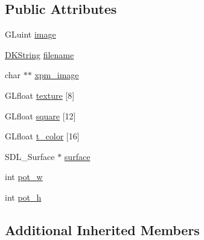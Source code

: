 \subsection*{Public Attributes}
\begin{DoxyCompactItemize}
\item 
G\-Luint \hyperlink{class_d_k_image_ac6a91aafc8bd16854d644186b2c3497b}{image}
\item 
\hyperlink{_d_k_string_8h_ac168e8555ceba18e1a2919b21976bc84}{D\-K\-String} \hyperlink{class_d_k_image_a12b6108f0fee5230984fd2275c24a8ae}{filename}
\item 
char $\ast$$\ast$ \hyperlink{class_d_k_image_a5552759919ce7e0ad63c542838e19fbe}{xpm\-\_\-image}
\item 
G\-Lfloat \hyperlink{class_d_k_image_a83ea3b25f68ec8d02b6a5b4daf18a2d5}{texture} \mbox{[}8\mbox{]}
\item 
G\-Lfloat \hyperlink{class_d_k_image_a7b0cb338893f6327718b19c92ffef3d4}{square} \mbox{[}12\mbox{]}
\item 
G\-Lfloat \hyperlink{class_d_k_image_ae6c9b9d773b56e6be7bc6fd3d299eb47}{t\-\_\-color} \mbox{[}16\mbox{]}
\item 
S\-D\-L\-\_\-\-Surface $\ast$ \hyperlink{class_d_k_image_ab8cc39cd81a6f73beca7392f6cb67abe}{surface}
\item 
int \hyperlink{class_d_k_image_a3df23f7ab223f3d7e6e2654395ef6fe1}{pot\-\_\-w}
\item 
int \hyperlink{class_d_k_image_ae9cdd848d1f31c486d4433b3739363a2}{pot\-\_\-h}
\end{DoxyCompactItemize}
\subsection*{Additional Inherited Members}


